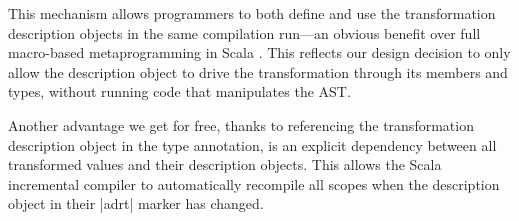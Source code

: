 This mechanism allows programmers to both define and use the transformation description objects in the same compilation run---an obvious benefit over full macro-based metaprogramming in Scala \cite{eugene-macros}. This reflects our design decision to only allow the description object to drive the transformation through its members and types, without running code that manipulates the AST. 
%

Another advantage we get for free, thanks to referencing the transformation description object in the type annotation, is an explicit dependency between all transformed values and their description objects. This allows the Scala incremental compiler to automatically recompile all scopes when the description object in their |adrt| marker has changed.





